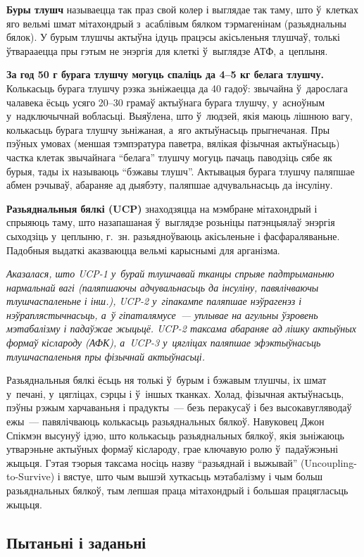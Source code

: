 \textbf{Буры тлушч} называецца так праз свой колер і выглядае так таму, што ў~клетках яго вельмі шмат мітахондрый з~асаблівым бялком тэрмагенінам (разьяднальны бялок). У бурым тлушчы актыўна ідуць працэсы акісьленьня тлушчаў, толькі ўтварааецца пры гэтым не энэргія для клеткі ў~выглядзе АТФ, а~цеплыня.

\textbf{За год 50 г бурага тлушчу могуць спаліць да 4--5 кг белага тлушчу.} Колькасьць бурага тлушчу рэзка зьніжаецца да 40 гадоў: звычайна ў~дарослага чалавека ёсьць усяго 20--30 грамаў актыўнага бурага тлушчу, у~асноўным у~надключычнай вобласьці. Выяўлена, што ў~людзей, якія маюць лішнюю вагу, колькасьць бурага тлушчу зьніжаная, а~яго актыўнасьць прыгнечаная. Пры пэўных умовах (меншая тэмпэратура паветра, вялікая фізычная актыўнасьць) частка клетак звычайнага ``белага'' тлушчу могуць пачаць паводзіць сябе як бурыя, тады іх называюць ``бэжавы тлушч''. Актывацыя бурага тлушчу паляпшае абмен рэчываў, абараняе ад дыябэту, паляпшае адчувальнасьць да інсуліну.

\textbf{Разьяднальныя бялкі (UCP)} знаходзяцца на мэмбране мітахондрый і спрыяюць таму, што назапашаная ў~выглядзе розьніцы патэнцыялаў энэргія сыходзіць у~цеплыню, г.~зн. разьядноўваюць акісьленьне і фасфараляваньне. Падобныя выдаткі аказваюцца вельмі карыснымі для арганізма.

\emph{Аказалася, што UCP-1 у~бурай тлушчавай тканцы спрыяе падтрыманьню нармальнай вагі (паляпшаючы адчувальнасьць да інсуліну, павялічваючы тлушчаспаленьне і інш.), UCP-2 у~гіпакампе паляпшае нэўрагенэз і нэўраплястычнасьць, а~ў гіпаталямусе~--- уплывае на агульны ўзровень мэтабалізму і падаўжае жыцьцё. UCP-2 таксама абараняе ад лішку актыўных формаў кіслароду (АФК), а~UCP-3 у~цягліцах паляпшае эфэктыўнасьць тлушчаспаленьня пры фізычнай актыўнасьці.}

Разьяднальныя бялкі ёсьць ня толькі ў~бурым і бэжавым тлушчы, іх шмат у~печані, у~цягліцах, сэрцы і ў~іншых тканках. Холад, фізычная актыўнасьць, пэўны рэжым харчаваньня і прадукты~--- безь перакусаў і без высокавугляводаў ежы~--- павялічваюць колькасьць разьяднальных бялкоў. Навуковец Джон Спікмэн высунуў ідэю, што колькасьць разьяднальных бялкоў, якія зьніжаюць утварэньне актыўных формаў кіслароду, грае ключавую ролю ў~падаўжэньні жыцьця. Гэтая тэорыя таксама носіць назву ``разьяднай і выжывай'' (Uncoupling-to-Survive) і вястуе, што чым вышэй хуткасьць мэтабалізму і чым больш разьяднальных бялкоў, тым лепшая праца мітахондрый і большая працягласьць жыцьця.

\subsection*{Пытаньні і заданьні}

